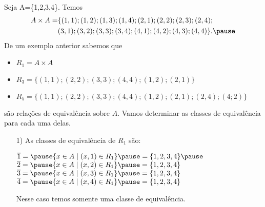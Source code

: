 \documentclass{beamer}
\begin{document}
    \begin{frame}
        \begin{exemplos}
            Seja A=\{1,2,3,4\}. \pause Temos
        \begin{align*}
            A\times A = &\{(1,1);(1,2);(1,3);(1,4);(2,1);(2,2);(2,3);(2,4);\\ &(3,1);(3,2);(3,3);(3,4);(4,1);(4,2);(4,3);(4,4)\}.\pause
        \end{align*}
        De um exemplo anterior sabemos que
        \begin{itemize}
            \item $R_{1}= A\times A$\pause
            \item $R_{3}=\{(1,1);(2,2);(3,3);(4,4);(1,2);(2,1)\}$\pause
            \item $R_{5}=\{(1,1);(2,2);(3,3);(4,4);(1,2);(2,1);(2,4);(4;2)\}$\pause
        \end{itemize}
        são relações de equivalência sobre $A$. \pause Vamos determinar as classes de equivalência para cada uma delas.\pause
    \end{exemplos}
    \end{frame}
    \begin{frame}
    \begin{exemplos}
    \begin{enumerate}
        \item[1)] As classes de equival\^encia de $R_1$ s\~ao:\pause
        \begin{center}
            $\overline{1} = \pause \{x \in A \mid (x,1) \in R_1\} \pause = \{1,2,3,4\}\pause$\\
            $\overline{2} = \pause \{x \in A \mid (x,2) \in R_1\} \pause = \{1,2,3,4\}$\pause \\
            $\overline{3} = \pause \{x \in A \mid (x,3) \in R_1\} \pause = \{1,2,3,4\}$\pause \\
            $\overline{4} = \pause \{x \in A \mid (x,4) \in R_1\} \pause = \{1,2,3,4\}$\pause \\
        \end{center}
        Nesse caso temos somente uma classe de equival\^encia.
    \end{enumerate}
    \end{exemplos}
    \end{frame}
\end{document}
